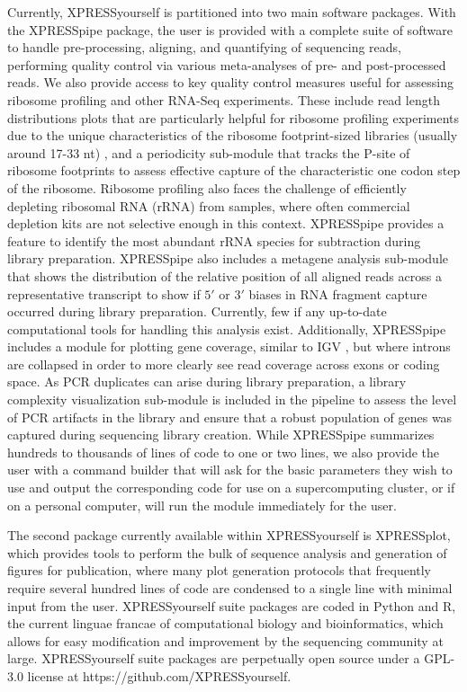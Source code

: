 \documentclass[10pt, oneside]{article}
\begin{document}
Currently, XPRESSyourself is partitioned into two main software packages. With the XPRESSpipe package, the user is provided with a complete suite of software to handle pre-processing, aligning, and quantifying of sequencing reads, performing quality control via various meta-analyses of pre- and post-processed reads. We also provide access to key quality control measures useful for assessing ribosome profiling and other RNA-Seq experiments. These include read length distributions plots that are particularly helpful for ribosome profiling experiments due to the unique characteristics of the ribosome footprint-sized libraries (usually around 17-33 nt) \cite{fp_range}, and a periodicity sub-module that tracks the P-site of ribosome footprints to assess effective capture of the characteristic one codon step of the ribosome. Ribosome profiling also faces the challenge of efficiently depleting ribosomal RNA (rRNA) from samples, where often commercial depletion kits are not selective enough in this context. XPRESSpipe provides a feature to identify the most abundant rRNA species for subtraction during library preparation. XPRESSpipe also includes a metagene analysis sub-module that shows the distribution of the relative position of all aligned reads across a representative transcript to show if $5'$ or $3'$ biases in RNA fragment capture occurred during library preparation. Currently, few if any up-to-date computational tools for handling this analysis exist. Additionally, XPRESSpipe includes a module for plotting gene coverage, similar to IGV \cite{igv}, but where introns are collapsed in order to more clearly see read coverage across exons or coding space. As PCR duplicates can arise during library preparation, a library complexity visualization sub-module is included in the pipeline to assess the level of PCR artifacts in the library and ensure that a robust population of genes was captured during sequencing library creation. While XPRESSpipe summarizes hundreds to thousands of lines of code to one or two lines, we also provide the user with a command builder that will ask for the basic parameters they wish to use and output the corresponding code for use on a supercomputing cluster, or if on a personal computer, will run the module immediately for the user. \par

The second package currently available within XPRESSyourself is XPRESSplot, which provides tools to perform the bulk of sequence analysis and generation of figures for publication, where many plot generation protocols that frequently require several hundred lines of code are condensed to a single line with minimal input from the user. XPRESSyourself suite packages are coded in Python and R, the current linguae francae of computational biology and bioinformatics, which allows for easy modification and improvement by the sequencing community at large. XPRESSyourself suite packages are perpetually open source under a GPL-3.0 license at https://github.com/XPRESSyourself. \par
\end{document}
